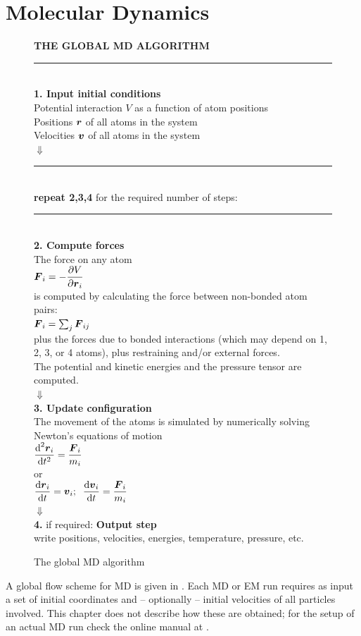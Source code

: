 \section{Molecular Dynamics}
\label{sec:MD}
\begin{figure}
\begin{center}
\addtolength{\fboxsep}{0.5cm}
\begin{shadowenv}[12cm]
{\large \bf THE GLOBAL MD ALGORITHM}
\rule{\textwidth}{2pt} \\
{\bf 1. Input initial conditions}\\[2ex]
Potential interaction $V$ as a function of atom positions\\
Positions $\mbox{\boldmath ${r}$}$ of all atoms in the system\\
Velocities $\mbox{\boldmath ${v}$}$ of all atoms in the system \\
$\Downarrow$\\
\rule{\textwidth}{1pt}\\
{\bf repeat 2,3,4} for the required number of steps:\\
\rule{\textwidth}{1pt}\\
{\bf 2. Compute forces} \\[1ex]
The force on any atom  \\[1ex]
$\mbox{\boldmath ${F}$}_i = - \displaystyle\frac{\partial V}{\partial \mbox{\boldmath ${r}$}_i}$ \\[1ex]
is computed by calculating the force between non-bonded atom pairs: \\
$\mbox{\boldmath ${F}$}_i = \sum_j \mbox{\boldmath ${F}$}_{ij}$ \\
plus the forces due to bonded interactions (which may depend on 1, 2,
3, or 4 atoms), plus restraining and/or external forces. \\
The potential and kinetic energies and the pressure tensor are computed. \\   
$\Downarrow$\\
{\bf 3. Update configuration} \\[1ex]
The movement of the atoms is simulated by numerically solving Newton's
equations of motion \\[1ex]
$\displaystyle
\frac {\mbox{d}^2\mbox{\boldmath ${r}$}_i}{\mbox{d} t^2} = \frac{\mbox{\boldmath ${F}$}_i}{m_i} $ \\
or \\
$\displaystyle
\frac{\mbox{d}\mbox{\boldmath ${r}$}_i}{\mbox{d} t} = \mbox{\boldmath ${v}$}_i ; \;\;
\frac{\mbox{d}\mbox{\boldmath ${v}$}_i}{\mbox{d} t} = \frac{\mbox{\boldmath ${F}$}_i}{m_i} $ \\[1ex]
$\Downarrow$ \\
{\bf 4.} if required: {\bf Output step} \\
write positions, velocities, energies, temperature, pressure, etc. \\
\end{shadowenv}
\caption{The global MD algorithm}
\label{fig:global}
\end{center}
\end{figure}
A global flow scheme for MD is given in . Each
MD or  EM run requires as input a set of initial coordinates and --
optionally -- initial velocities of all particles involved. This
chapter does not describe how these are obtained; for the setup of an
actual MD run check the online manual at {\wwwpage}.

